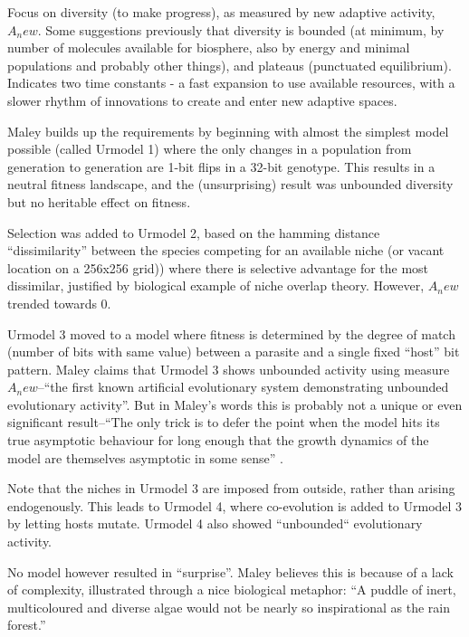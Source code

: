 \begin{DRAFT}
\parencite{Maley1999}
Focus on diversity (to make progress), as measured by new adaptive activity, $A_new$. Some suggestions previously that diversity is bounded (at minimum, by number of molecules available for biosphere, also by energy and minimal populations and probably other things), and plateaus (punctuated equilibrium). Indicates two time constants - a fast expansion to use available resources, with a slower rhythm of innovations to create and enter new adaptive spaces.

Maley builds up the requirements by beginning with almost the simplest model possible (called Urmodel 1) where the only changes in a population from generation to generation are 1-bit flips in a 32-bit genotype. This results in a neutral fitness landscape, and the (unsurprising) result was unbounded diversity but no heritable effect on fitness.

Selection was added to Urmodel 2, based on the hamming distance ``dissimilarity'' between the species competing for an available niche (or vacant location on a 256x256 grid)) where there is selective advantage for the most dissimilar, justified by biological example of niche overlap theory. However, $A_new$ trended towards $0$.

Urmodel 3 moved to a model where fitness is determined by the degree of match (number of bits with same value) between a parasite and a single fixed ``host'' bit pattern. Maley claims that Urmodel 3 shows unbounded activity using measure $A_new$--``the first known artificial evolutionary system demonstrating unbounded evolutionary activity''. But in Maley's words this is probably not a unique or even significant result--``The only trick is to defer the point when the model hits its true asymptotic behaviour for long enough that the growth dynamics of the model are themselves asymptotic in some sense'' \parencite{Maley1999}.

Note that the niches in Urmodel 3 are imposed from outside, rather than arising endogenously. This leads to Urmodel 4, where co-evolution is added to Urmodel 3 by letting hosts mutate. Urmodel 4 also showed ``unbounded`` evolutionary activity.

No model however resulted in ``surprise''. Maley believes this is because of a lack of complexity, illustrated through a nice biological metaphor: ``A puddle of inert, multicoloured and diverse algae would not be nearly so inspirational as the rain forest.''




\end{DRAFT}
